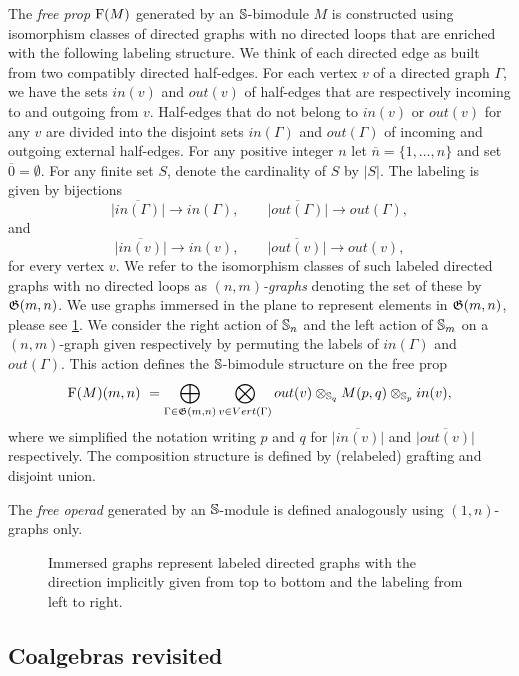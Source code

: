 The \textit{free prop} $\free(M)$ generated by an $\S$-bimodule $M$ is constructed using isomorphism classes of directed graphs with no directed loops that are enriched with the following labeling structure.
We think of each directed edge as built from two compatibly directed half-edges.
For each vertex $v$ of a directed graph $\Gamma$, we have the sets $in(v)$ and $out(v)$ of half-edges that are respectively incoming to and outgoing from $v$.
Half-edges that do not belong to $in(v)$ or $out(v)$ for any $v$ are divided into the disjoint sets $in(\Gamma)$ and $out(\Gamma)$ of incoming and outgoing external half-edges.
For any positive integer $n$ let $\overline{n} = \{1, \dots, n\}$ and set $\overline{0} = \emptyset$.
For any finite set $S$, denote the cardinality of $S$ by $|S|$.
The labeling is given by bijections
\[
\overline{|in(\Gamma)|}\to in(\Gamma), \qquad
\overline{|out(\Gamma)|}\to out(\Gamma),
\]
and
\[
\overline{|in(v)|}\to in(v), \qquad
\overline{|out(v)|}\to out(v),
\]
for every vertex $v$.
We refer to the isomorphism classes of such labeled directed graphs with no directed loops as $(n,m)$\textit{-graphs} denoting the set of these by $\graphs(m,n)$.
We use graphs immersed in the plane to represent elements in $\graphs(m,n)$, please see \cref{f:immersion}.
We consider the right action of $\S_n$ and the left action of $\S_m$ on a $(n,m)$-graph given respectively by permuting the labels of $in(\Gamma)$ and $out(\Gamma)$.
This action defines the $\S$-bimodule structure on the free prop
\begin{equation} \label{e:free prop}
\free(M)(m,n) \ = \bigoplus_{\Gamma \in \graphs(m,n)} \bigotimes_{v \in Vert(\Gamma)} out(v) \otimes_{\S_q} M(p, q) \otimes_{\S_p} in(v),
\end{equation}
where we simplified the notation writing $p$ and $q$ for $\overline{|in(v)|}$ and $\overline{|out(v)|}$ respectively.
The composition structure is defined by (relabeled) grafting and disjoint union.

The \textit{free operad} generated by an $\S$-module is defined analogously using $(1,n)$-graphs only.

\begin{figure}
	
	\caption{Immersed graphs represent labeled directed graphs with the direction implicitly given from top to bottom and the labeling from left to right.}
	\label{f:immersion}
\end{figure}

\subsection{Coalgebras revisited}

